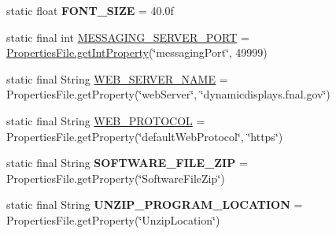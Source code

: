 \begin{DoxyCompactItemize}
\item 
\hypertarget{classgov_1_1fnal_1_1ppd_1_1dd_1_1GlobalVariables_a9331af89f789ea1b54581c0198f7a43d}{static float {\bfseries F\-O\-N\-T\-\_\-\-S\-I\-Z\-E} = 40.\-0f}\label{classgov_1_1fnal_1_1ppd_1_1dd_1_1GlobalVariables_a9331af89f789ea1b54581c0198f7a43d}

\item 
static final int \hyperlink{classgov_1_1fnal_1_1ppd_1_1dd_1_1GlobalVariables_a3afb8f4fd1dbbc82329ea9ff4aa3629e}{M\-E\-S\-S\-A\-G\-I\-N\-G\-\_\-\-S\-E\-R\-V\-E\-R\-\_\-\-P\-O\-R\-T} = \hyperlink{classgov_1_1fnal_1_1ppd_1_1dd_1_1util_1_1nonguiUtils_1_1PropertiesFile_a5ed1fc6f67450475cdff0256ca4d6aad}{Properties\-File.\-get\-Int\-Property}(\char`\"{}messaging\-Port\char`\"{}, 49999)
\item 
static final String \hyperlink{classgov_1_1fnal_1_1ppd_1_1dd_1_1GlobalVariables_af5ffb15826513fabba402ec017edbc70}{W\-E\-B\-\_\-\-S\-E\-R\-V\-E\-R\-\_\-\-N\-A\-M\-E} = Properties\-File.\-get\-Property(\char`\"{}web\-Server\char`\"{}, \char`\"{}dynamicdisplays.\-fnal.\-gov\char`\"{})
\item 
static final String \hyperlink{classgov_1_1fnal_1_1ppd_1_1dd_1_1GlobalVariables_aa3bf05d555f0c3489c60664ae54a2480}{W\-E\-B\-\_\-\-P\-R\-O\-T\-O\-C\-O\-L} = Properties\-File.\-get\-Property(\char`\"{}default\-Web\-Protocol\char`\"{}, \char`\"{}https\char`\"{})
\item 
\hypertarget{classgov_1_1fnal_1_1ppd_1_1dd_1_1GlobalVariables_ab8e56e6480b2c30248d2e20aee782cb4}{static final String {\bfseries S\-O\-F\-T\-W\-A\-R\-E\-\_\-\-F\-I\-L\-E\-\_\-\-Z\-I\-P} = Properties\-File.\-get\-Property(\char`\"{}Software\-File\-Zip\char`\"{})}\label{classgov_1_1fnal_1_1ppd_1_1dd_1_1GlobalVariables_ab8e56e6480b2c30248d2e20aee782cb4}

\item 
\hypertarget{classgov_1_1fnal_1_1ppd_1_1dd_1_1GlobalVariables_a3b3484a9eaa4099af2a1ade1fa0f94a5}{static final String {\bfseries U\-N\-Z\-I\-P\-\_\-\-P\-R\-O\-G\-R\-A\-M\-\_\-\-L\-O\-C\-A\-T\-I\-O\-N} = Properties\-File.\-get\-Property(\char`\"{}Unzip\-Location\char`\"{})}\label{classgov_1_1fnal_1_1ppd_1_1dd_1_1GlobalVariables_a3b3484a9eaa4099af2a1ade1fa0f94a5}


\end{DoxyCompactItemize}
